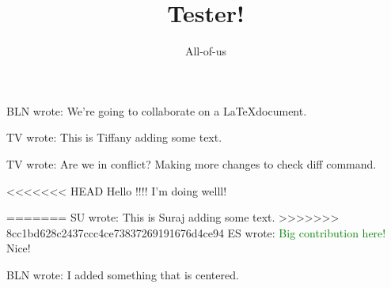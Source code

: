 \documentclass[12pt]{article}
\title{Tester!}
\author{All-of-us}
\newcommand{\bln}[1]{BLN wrote: \textcolor{red!70!blue!70}{#1}}
\newcommand{\tv}[1]{TV wrote: \textcolor{blue!70}{#1}}
\newcommand{\su}[1]{SU wrote: \textcolor{green!70}{#1}}
\newcommand{\es}[1]{ES wrote: \textcolor{green}{#1}}
\begin{document}
\maketitle

\bln{We're going to collaborate on a \LaTeX document.}

\tv{This is Tiffany adding some text.}

\tv{Are we in conflict? Making more changes to check diff command.}

<<<<<<< HEAD
Hello !!!! I'm doing welll!

=======
\su{This is Suraj adding some text.}
>>>>>>> 8cc1bd628c2437ccc4ce73837269191676d4ce94
\es{Big contribution here!}
{Nice!}


\begin{center}
  \bln{I added something that is centered.}
\end{center}
\end{document}
